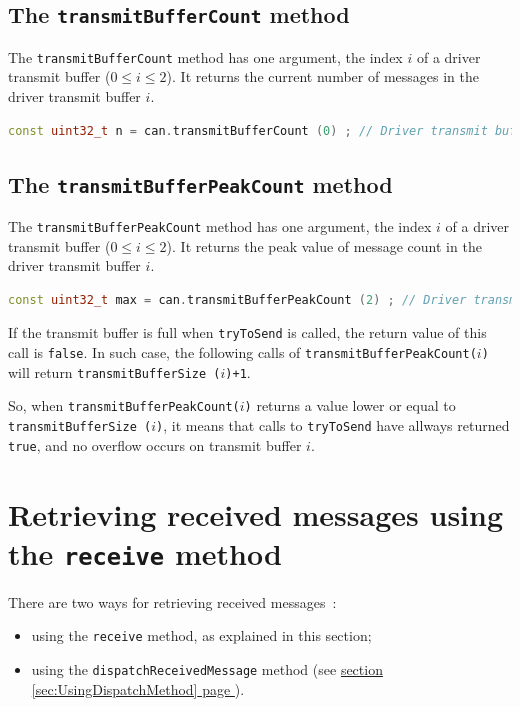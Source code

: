 \documentclass[10pt, a4paper, obeyspaces, openany]{extarticle}
\newcommand \sectionLabel[2]{\section{#1}\label{sec:#2}}
\newcommand\refSectionPage[1]{\hyperref[sec:#1]{section \ref*{sec:#1} page \pageref{sec:#1}}}
\begin{document}
\subsection{The \texttt{transmitBufferCount} method}

The \texttt{transmitBufferCount} method has one argument, the index $i$ of a driver transmit buffer ($0 \leqslant i \leqslant 2$). It returns the current number of messages in the driver transmit buffer $i$.
{ \small\begin{lstlisting}[language=c++]
const uint32_t n = can.transmitBufferCount (0) ; // Driver transmit buffer 0
\end{lstlisting}}


\subsection{The \texttt{transmitBufferPeakCount} method}

The \texttt{transmitBufferPeakCount} method has one argument, the index $i$ of a driver transmit buffer ($0 \leqslant i \leqslant 2$). It returns the peak value of message count in the driver transmit buffer $i$.
{ \small\begin{lstlisting}[language=c++]
const uint32_t max = can.transmitBufferPeakCount (2) ; // Driver transmit buffer 0
\end{lstlisting}}

If the transmit buffer is full when \texttt{tryToSend} is called, the return value of this call is \texttt{false}. In such case, the following calls of \texttt{transmitBufferPeakCount($i$)} will return \texttt{transmitBufferSize ($i$)+1}. 

So, when \texttt{transmitBufferPeakCount($i$)} returns a value lower or equal to \texttt{transmitBufferSize ($i$)}, it means that calls to \texttt{tryToSend} have allways returned \texttt{true}, and no overflow occurs on transmit buffer $i$.

















\sectionLabel{Retrieving received messages using the \texttt{receive} method}{UsingReceiveMethod}

There are two ways for retrieving received messages~:
\begin{itemize}
  \item using the \texttt{receive} method, as explained in this section;
  \item using the \texttt{dispatchReceivedMessage} method (see \refSectionPage{UsingDispatchMethod}).
\end{itemize}
\end{document}
